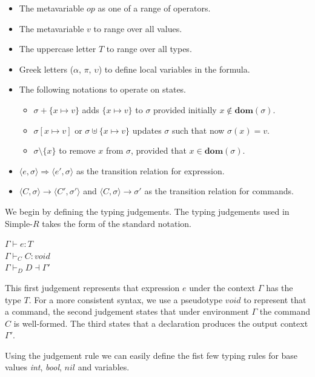 \documentclass[a4paper,12pt]{report}
\begin{document}
\renewcommand\labelitemii{$\blacksquare$}
\begin{itemize}
  \item The metavariable $op$ as one of a range of operators. 
  \item The metavariable $v$ to range over all values.
  \item The uppercase letter $T$ to range over all types.
  \item Greek letters ($\alpha$, $\pi$, $\upsilon$) to define local variables in 
  the formula. 
  \item The following notations to operate on states. 
    \begin{itemize}
      \item $\sigma + \{x \mapsto v\}$ adds $\{x \mapsto v\}$ to $\sigma$ provided initially $x \notin\textbf{dom}(\sigma)$. 
      \item $\sigma[x \mapsto v]$ or $\sigma \uplus \{x \mapsto v\}$ updates $\sigma$ such that now $\sigma(x) = v$.
      \item $\sigma \setminus \{x\}$ to remove $x$ from $\sigma$, provided that $x \in \textbf{dom}(\sigma)$.
    \end{itemize}
  \item $\langle e, \sigma \rangle \Longrightarrow \langle e', \sigma \rangle$ as the transition relation for expression.
  \item $\langle C, \sigma \rangle \longrightarrow \langle C', \sigma' \rangle$ and $\langle C, \sigma \rangle \longrightarrow \sigma'$ as the transition relation for commands.
\end{itemize}

\par
We begin by defining the typing judgements. The typing judgements used in 
Simple-$R$ takes the form of the standard notation. 
\begin{center}
  $\Gamma \vdash e : T$\\
  $\Gamma \vdash_{C} C : void$\\
  $\Gamma \vdash_{D} D \dashv \Gamma'$\\
\end{center}
This first judgement represents that expression $e$ 
under the context $\Gamma$ has the type $T$. For a more consistent syntax, 
we use a pseudotype $void$ to represent that a command, the second judgement 
states that under environment $\Gamma$ the command $C$ is well-formed. 
The third states that a declaration produces the output context $\Gamma'$.

\par
Using the judgement rule we can easily define the fist few typing rules for base 
values \textit{int}, \textit{bool}, $nil$ and variables.
\end{document}
